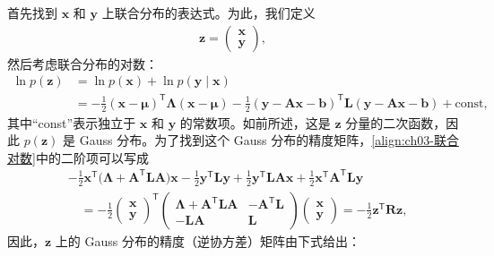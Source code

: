 \documentclass[../../main.tex]{subfiles}
\begin{document}
首先找到 $\boldsymbol{x}$ 和 $\boldsymbol{y}$ 上联合分布的表达式。为此，我们定义
\begin{align}
\boldsymbol{z}=\begin{pmatrix}\boldsymbol{x}\\ \boldsymbol{y}\end{pmatrix},
\label{align:ch03-联合变量}
\end{align}
然后考虑联合分布的对数：
\begin{align}
\ln p(\boldsymbol{z})&=\ln p(\boldsymbol{x})+\ln p(\boldsymbol{y}\mid\boldsymbol{x})\nonumber\\
&=-\frac{1}{2}(\boldsymbol{x}-\boldsymbol{\mu})^{\mathsf{T}}\boldsymbol{\Lambda}(\boldsymbol{x}-\boldsymbol{\mu})-\frac{1}{2}(\boldsymbol{y}-\boldsymbol{A}\boldsymbol{x}-\boldsymbol{b})^{\mathsf{T}}\boldsymbol{L}(\boldsymbol{y}-\boldsymbol{A}\boldsymbol{x}-\boldsymbol{b})+\text{const},
\label{align:ch03-联合对数}
\end{align}
其中“const”表示独立于 $\boldsymbol{x}$ 和 $\boldsymbol{y}$ 的常数项。如前所述，这是 $\boldsymbol{z}$ 分量的二次函数，因此 $p(\boldsymbol{z})$ 是 Gauss 分布。为了找到这个 Gauss 分布的精度矩阵，\eqref{align:ch03-联合对数}中的二阶项可以写成
\begin{align}
&-\frac{1}{2}\boldsymbol{x}^{\mathsf{T}}\bigl(\boldsymbol{\Lambda}+\boldsymbol{A}^{\mathsf{T}}\boldsymbol{L}\boldsymbol{A}\bigr)\boldsymbol{x}-\frac{1}{2}\boldsymbol{y}^{\mathsf{T}}\boldsymbol{L}\boldsymbol{y}+\frac{1}{2}\boldsymbol{y}^{\mathsf{T}}\boldsymbol{L}\boldsymbol{A}\boldsymbol{x}+\frac{1}{2}\boldsymbol{x}^{\mathsf{T}}\boldsymbol{A}^{\mathsf{T}}\boldsymbol{L}\boldsymbol{y}\nonumber\\
&\quad=-\frac{1}{2}\begin{pmatrix}\boldsymbol{x}\\ \boldsymbol{y}\end{pmatrix}^{\mathsf{T}}\begin{pmatrix}\boldsymbol{\Lambda}+\boldsymbol{A}^{\mathsf{T}}\boldsymbol{L}\boldsymbol{A} & -\boldsymbol{A}^{\mathsf{T}}\boldsymbol{L}\\ -\boldsymbol{L}\boldsymbol{A} & \boldsymbol{L}\end{pmatrix}\begin{pmatrix}\boldsymbol{x}\\ \boldsymbol{y}\end{pmatrix}=-\frac{1}{2}\boldsymbol{z}^{\mathsf{T}}\boldsymbol{R}\boldsymbol{z},
\label{align:ch03-联合二次型}
\end{align}
因此，$\boldsymbol{z}$ 上的 Gauss 分布的精度（逆协方差）矩阵由下式给出：
\end{document}
